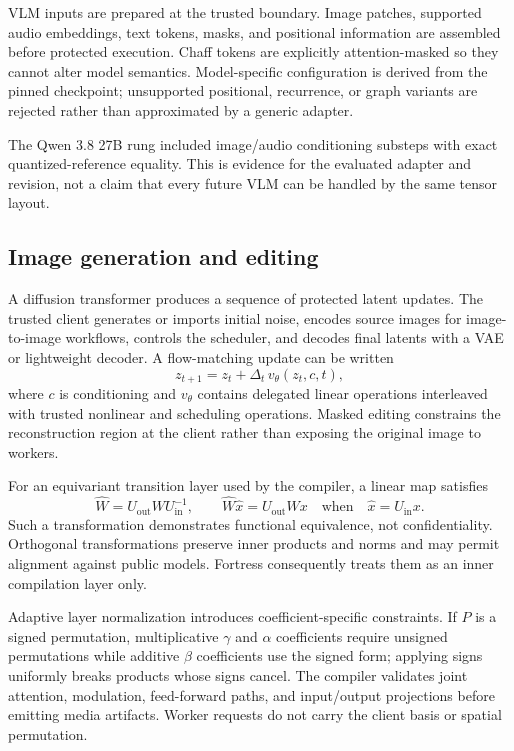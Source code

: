 VLM inputs are prepared at the trusted boundary. Image patches, supported audio embeddings, text tokens, masks, and positional information are assembled before protected execution. Chaff tokens are explicitly attention-masked so they cannot alter model semantics. Model-specific configuration is derived from the pinned checkpoint; unsupported positional, recurrence, or graph variants are rejected rather than approximated by a generic adapter.

The Qwen 3.8 27B rung included image/audio conditioning substeps with exact quantized-reference equality. This is evidence for the evaluated adapter and revision, not a claim that every future VLM can be handled by the same tensor layout.

\subsection{Image generation and editing}

A diffusion transformer produces a sequence of protected latent updates. The trusted client generates or imports initial noise, encodes source images for image-to-image workflows, controls the scheduler, and decodes final latents with a VAE or lightweight decoder. A flow-matching update can be written
\begin{equation}
z_{t+1}=z_t+\Delta_t\,v_\theta(z_t,c,t),
\end{equation}
where $c$ is conditioning and $v_\theta$ contains delegated linear operations interleaved with trusted nonlinear and scheduling operations. Masked editing constrains the reconstruction region at the client rather than exposing the original image to workers.

For an equivariant transition layer used by the compiler, a linear map satisfies
\begin{equation}
\widehat{W}=U_{\mathrm{out}}WU_{\mathrm{in}}^{-1},\qquad
\widehat{W}\widehat{x}=U_{\mathrm{out}}Wx
\quad\text{when}\quad \widehat{x}=U_{\mathrm{in}}x.
\label{eq:equivariance}
\end{equation}
Such a transformation demonstrates functional equivalence, not confidentiality. Orthogonal transformations preserve inner products and norms and may permit alignment against public models. Fortress consequently treats them as an inner compilation layer only.

Adaptive layer normalization introduces coefficient-specific constraints. If $P$ is a signed permutation, multiplicative $\gamma$ and $\alpha$ coefficients require unsigned permutations while additive $\beta$ coefficients use the signed form; applying signs uniformly breaks products whose signs cancel. The compiler validates joint attention, modulation, feed-forward paths, and input/output projections before emitting media artifacts. Worker requests do not carry the client basis or spatial permutation.

